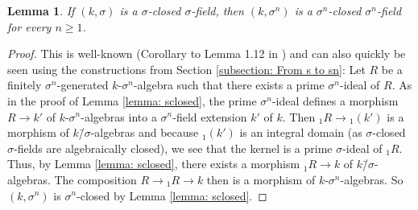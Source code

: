\documentclass[oneside,reqno]{amsart}
\newtheorem{lemma}[theo]{Lemma}
\theoremstyle{definition}
\newcommand{\s}{\sigma}
\newcommand{\ks}{$k$\=/$\s$}
\begin{document}
\begin{lemma} \label{lemma: sclosed implies snclosed}
	If $(k,\s)$ is a $\s$-closed $\s$-field, then $(k,\s^n)$ is a $\s^n$-closed $\s^n$-field for every $n\geq 1$.
\end{lemma}
\begin{proof}
	This is well-known (Corollary to Lemma 1.12 in \cite{ChatzidakisHrushovski:ModelTheoryOfDifferenceFields}) and can also quickly be seen using the constructions from Section \ref{subsection: From s to sn}: Let $R$ be a finitely $\s^n$-generated $k$-$\s^n$-algebra such that there exists a prime $\s^n$-ideal of $R$. As in the proof of Lemma \ref{lemma: sclosed}, the prime $\s^n$-ideal defines a morphism $R\to k'$ of $k$-$\s^n$-algebras into a $\s^n$-field extension $k'$ of $k$. Then ${_1R}\to{_1(k')}$ is a morphism of \ks-algebras and because ${_1(k')}$ is an integral domain (as $\s$-closed $\s$-fields are algebraically closed), we see that the kernel is a prime $\s$-ideal of ${_1R}$. Thus, by Lemma \ref{lemma: sclosed}, there exists a morphism ${_1R}\to k$ of \ks-algebras. The composition $R\to {_1R}\to k$ then is a morphism of $k$-$\s^n$-algebras. So $(k,\s^n)$ is $\s^n$-closed by Lemma \ref{lemma: sclosed}.
\end{proof}	
\end{document}
